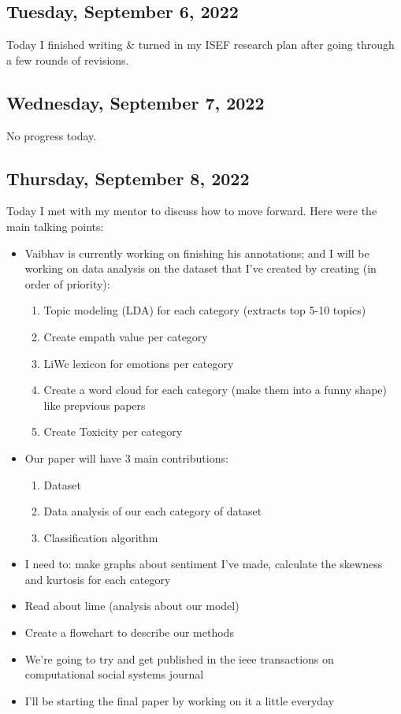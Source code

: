 \documentclass[11pt,letterpaper]{article}
\begin{document}
\subsection{Tuesday, September 6, 2022}
Today I finished writing & turned in my ISEF research plan after going through a few rounds of revisions.

\subsection{Wednesday, September 7, 2022}
No progress today.

\subsection{Thursday, September 8, 2022}
Today I met with my mentor to discuss how to move forward. Here were the main talking points:
\begin{itemize}
    \item Vaibhav is currently working on finishing his annotations; and I will be working on data analysis on the dataset that I've created by creating (in order of priority):
    \begin{enumerate}
        \item Topic modeling (LDA) for each category (extracts top 5-10 topics)
        \item Create empath value per category
        \item LiWc lexicon for emotions per category
        \item Create a word cloud for each category (make them into a funny shape) like prepvious papers
        \item Create Toxicity per category
    \end{enumerate}
    \item Our paper will have 3 main contributions:
    \begin{enumerate}
        \item Dataset
        \item Data analysis of our each category of dataset
        \item Classification algorithm
    \end{enumerate}
    
    \item I need to: make graphs about sentiment I’ve made, calculate the skewness and kurtosis for each category
    \item Read about lime (analysis about our model)
    \item Create a flowchart to describe our methods
    \item We're going to try and get published in the ieee transactions on computational social systems journal
    \item I'll be starting the final paper by working on it a little everyday
\end{itemize}
\end{document}
